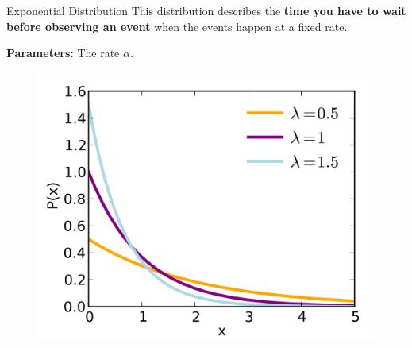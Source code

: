 %
\begin{frame}{Exponential Distribution}
This distribution describes the \textbf{time you have to wait before observing
an event} when the events happen at a fixed rate.

\hfill

\textbf{Parameters:} The rate $\alpha$.

  \begin{figure}
    \includegraphics[scale=0.4]{exponential-pdf}
  \end{figure}

\end{frame}
%
